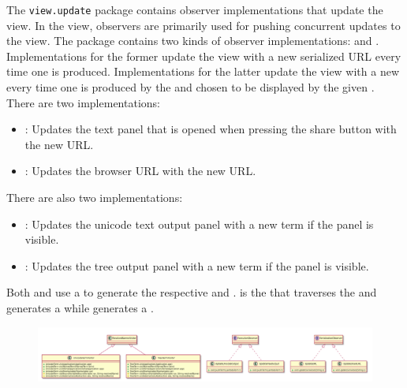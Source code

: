 The \texttt{view.update} package contains observer implementations that update the view. In the view, observers are primarily used for pushing concurrent updates to the view.
The package contains two kinds of observer implementations: \texttt{} and \texttt{}. 
Implementations for the former update the view with a new serialized URL every time one is produced. 
Implementations for the latter update the view with a new \texttt{} every time one is produced by the \texttt{} and chosen to be displayed by the given \texttt{}.
There are two \texttt{} implementations:
\begin{itemize}
	\item \texttt{}: Updates the text panel that is opened when pressing the share button with the new URL.
	\item \texttt{}: Updates the browser URL with the new URL.
\end{itemize}
There are also two \texttt{} implementations:
\begin{itemize}
	\item \texttt{}: Updates the unicode text output panel with a new term if the panel is visible.
	\item \texttt{}: Updates the tree output panel with a new term if the panel is visible.
\end{itemize}
Both \texttt{} and \texttt{} use a \texttt{} to generate the respective \texttt{} and \texttt{}.
\texttt{} is the \texttt{} that traverses the \texttt{} and generates a \texttt{} while \texttt{} generates a \texttt{}.

\begin{figure}[H]
	\centering
	\includegraphics[width=\textwidth]{packageDiagrams/updatePackage}
\end{figure}
